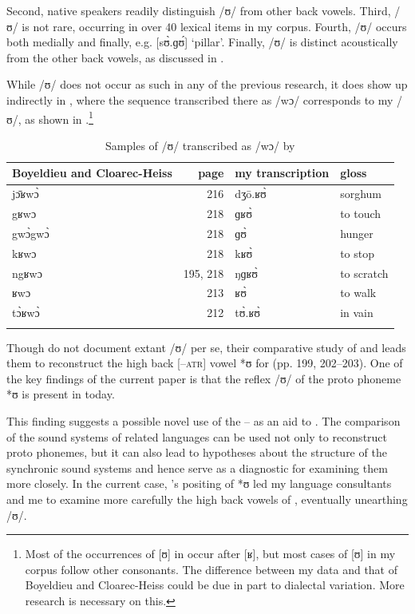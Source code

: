 \documentclass[output=paper,colorlinks,citecolor=brown]{langscibook}
\begin{document}
Second, native speakers readily distinguish /ʊ/ from other back vowels. Third, /ʊ/ is not rare, occurring in over 40 lexical items in my corpus. Fourth, /ʊ/ occurs both medially and finally, e.g. [sʊ̀.ɡʊ́] ‘pillar’. Finally, /ʊ/ is distinct acoustically from the other back vowels, as discussed in .

While /ʊ/ does not occur as such in any of the previous research, it does show up indirectly in \citet{BoyeldieuCloarec-Heiss2001}, where the sequence transcribed there as /wɔ/ corresponds to my /ʊ/, as shown in .\footnote{Most of the occurrences of [ʊ] in  occur after [ʁ], but most cases of [ʊ] in my corpus follow other consonants. The difference between my data and that of Boyeldieu and Cloarec-Heiss could be due in part to dialectal variation. More research is necessary on this.}

\begin{table}
\caption{Samples of /ʊ/ transcribed as /wɔ/ by \citet{BoyeldieuCloarec-Heiss2001}}
\label{tab:olson:9}
    \begin{tabularx}{\textwidth}{lrll}
    \lsptoprule
        Boyeldieu and Cloarec-Heiss & page & my transcription & gloss\\
    \midrule
        jɔ̄ʁwɔ̀ & 216 & dʒō.ʁʊ̀ & sorghum\\
        gʁwɔ & 218 & ɡʁʊ̀ & to touch\\
        gwɔ̀gwɔ̀ & 218 & ɡʊ̀ & hunger\\
        kʁwɔ & 218 & kʁʊ̀ & to stop\\
        ngʁwɔ & 195, 218 & ŋɡʁʊ̀ & to scratch\\
        ʁwɔ & 213 & ʁʊ̀ & to walk\\
        tɔ̀ʁwɔ̀ & 212 & tʊ̀.ʁʊ̀ & in vain\\
    \lspbottomrule
    \end{tabularx}
\end{table}

Though \citeauthor{BoyeldieuCloarec-Heiss2001} do not document extant /ʊ/ per se, their comparative study of  and  leads them to reconstruct the high back [–\textsc{atr}] vowel *ʊ for  (pp. 199, 202--203). One of the key findings of the current paper is that the reflex /ʊ/ of the proto phoneme *ʊ is present in  today.

This finding suggests a possible novel use of the  -- as an aid to . The comparison of the sound systems of related languages can be used not only to reconstruct proto phonemes, but it can also lead to hypotheses about the structure of the synchronic sound systems and hence serve as a diagnostic for examining them more closely. In the current case, \citeauthor{BoyeldieuCloarec-Heiss2001}'s positing of *ʊ led my language consultants and me to examine more carefully the high back vowels of , eventually unearthing /ʊ/.
\end{document}
